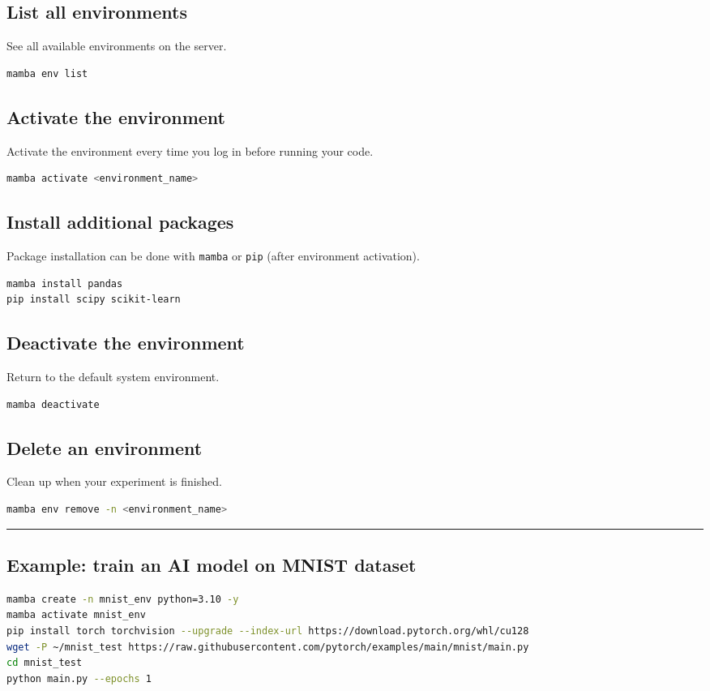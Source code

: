 \documentclass[a4paper, landscape]{article}
\begin{document}
\begin{multicols}{2}
\subsection*{List all environments}
\label{sec:org6dd2f96}
See all available environments on the server.
\begin{lstlisting}[language=sh,numbers=none]
mamba env list
\end{lstlisting}
\subsection*{Activate the environment}
\label{sec:org7556371}
Activate the environment every time you log in before running your code.
\begin{lstlisting}[language=sh,numbers=none]
mamba activate <environment_name>
\end{lstlisting}
\subsection*{Install additional packages}
\label{sec:orgc18a7be}
Package installation can be done with \texttt{mamba} or \texttt{pip} (after environment activation).
\begin{lstlisting}[language=sh,numbers=none]
mamba install pandas
pip install scipy scikit-learn
\end{lstlisting}
\subsection*{Deactivate the environment}
\label{sec:org38447f0}
Return to the default system environment.
\begin{lstlisting}[language=sh,numbers=none]
mamba deactivate
\end{lstlisting}
\subsection*{Delete an environment}
\label{sec:orga7a0bf1}
Clean up when your experiment is finished.
\begin{lstlisting}[language=sh,numbers=none]
mamba env remove -n <environment_name>
\end{lstlisting}
\vspace{0em}\noindent\rule{\linewidth}{0.4pt}\vspace{0em}
\subsection*{Example: train an AI model on MNIST dataset}
\label{sec:org5e2d11c}
\begin{lstlisting}[language=sh,numbers=none,basicstyle=\fontsize{8pt}{8.5pt}\ttfamily]
mamba create -n mnist_env python=3.10 -y
mamba activate mnist_env
pip install torch torchvision --upgrade --index-url https://download.pytorch.org/whl/cu128
wget -P ~/mnist_test https://raw.githubusercontent.com/pytorch/examples/main/mnist/main.py
cd mnist_test
python main.py --epochs 1
\end{lstlisting}
\columnbreak

\end{multicols}
\end{document}
